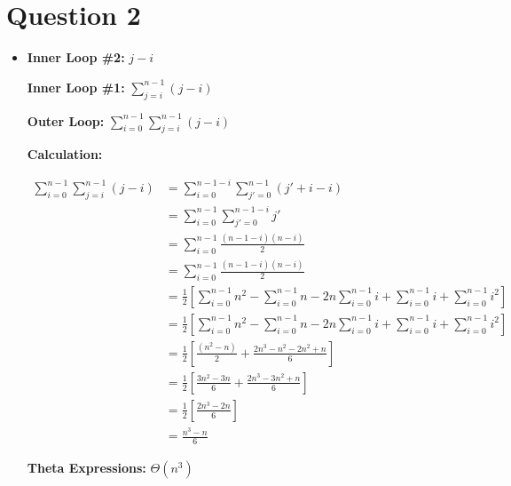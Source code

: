 \documentclass[12pt]{article}
\begin{document}
\section*{Question 2}
\begin{itemize}

    \item

    \textbf{Inner Loop \#2:} $j - i$

    \textbf{Inner Loop \#1:} $\sum\limits_{j=i}^{n - 1} (j - i)$

    \textbf{Outer Loop:} $\sum\limits_{i=0}^{n-1}\sum\limits_{j=i}^{n - 1} (j - i)$

    \textbf{Calculation:}

    \begin{align}
        \sum\limits_{i=0}^{n-1}\sum\limits_{j=i}^{n - 1} (j - i) &= \sum\limits_{i=0}^{n-1-i}\sum\limits_{j'=0}^{n - 1} (j' + i - i)\\
        &= \sum\limits_{i=0}^{n-1}\sum\limits_{j'=0}^{n-1-i} j'\\
        &= \sum\limits_{i=0}^{n-1} \frac{(n-1-i)(n-i)}{2}\\
        &= \sum\limits_{i=0}^{n-1} \frac{(n-1-i)(n-i)}{2}\\
        &= \frac{1}{2} \left[ \sum\limits_{i=0}^{n-1} n^2 - \sum\limits_{i=0}^{n-1} n - 2n \sum\limits_{i=0}^{n-1} i + \sum\limits_{i=0}^{n-1} i + \sum\limits_{i=0}^{n-1} i^2 \right]\\
        &= \frac{1}{2} \left[ \sum\limits_{i=0}^{n-1} n^2 - \sum\limits_{i=0}^{n-1} n - 2n \sum\limits_{i=0}^{n-1} i + \sum\limits_{i=0}^{n-1} i + \sum\limits_{i=0}^{n-1} i^2 \right]\\
        &= \frac{1}{2} \left[ \frac{(n^2 - n)}{2} + \frac{2n^3 - n^2 - 2n^2 + n}{6} \right]\\
        &= \frac{1}{2} \left[ \frac{3n^2 - 3n}{6} + \frac{2n^3 - 3n^2 + n}{6} \right]\\
        &= \frac{1}{2} \left[ \frac{2n^3 - 2n}{6} \right]\\
        &= \frac{n^3 - n}{6}
    \end{align}

    \textbf{Theta Expressions:} $\Theta (n^3)$



\end{itemize}
\end{document}
